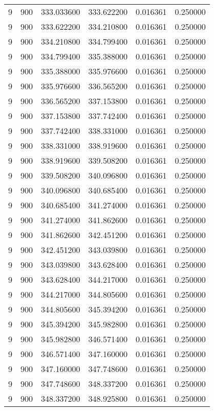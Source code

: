 \begin{longtable}{rrrrrr}
9 & 900 & 333.033600 & 333.622200 & 0.016361 & 0.250000 \\
9 & 900 & 333.622200 & 334.210800 & 0.016361 & 0.250000 \\
9 & 900 & 334.210800 & 334.799400 & 0.016361 & 0.250000 \\
9 & 900 & 334.799400 & 335.388000 & 0.016361 & 0.250000 \\
9 & 900 & 335.388000 & 335.976600 & 0.016361 & 0.250000 \\
9 & 900 & 335.976600 & 336.565200 & 0.016361 & 0.250000 \\
9 & 900 & 336.565200 & 337.153800 & 0.016361 & 0.250000 \\
9 & 900 & 337.153800 & 337.742400 & 0.016361 & 0.250000 \\
9 & 900 & 337.742400 & 338.331000 & 0.016361 & 0.250000 \\
9 & 900 & 338.331000 & 338.919600 & 0.016361 & 0.250000 \\
9 & 900 & 338.919600 & 339.508200 & 0.016361 & 0.250000 \\
9 & 900 & 339.508200 & 340.096800 & 0.016361 & 0.250000 \\
9 & 900 & 340.096800 & 340.685400 & 0.016361 & 0.250000 \\
9 & 900 & 340.685400 & 341.274000 & 0.016361 & 0.250000 \\
9 & 900 & 341.274000 & 341.862600 & 0.016361 & 0.250000 \\
9 & 900 & 341.862600 & 342.451200 & 0.016361 & 0.250000 \\
9 & 900 & 342.451200 & 343.039800 & 0.016361 & 0.250000 \\
9 & 900 & 343.039800 & 343.628400 & 0.016361 & 0.250000 \\
9 & 900 & 343.628400 & 344.217000 & 0.016361 & 0.250000 \\
9 & 900 & 344.217000 & 344.805600 & 0.016361 & 0.250000 \\
9 & 900 & 344.805600 & 345.394200 & 0.016361 & 0.250000 \\
9 & 900 & 345.394200 & 345.982800 & 0.016361 & 0.250000 \\
9 & 900 & 345.982800 & 346.571400 & 0.016361 & 0.250000 \\
9 & 900 & 346.571400 & 347.160000 & 0.016361 & 0.250000 \\
9 & 900 & 347.160000 & 347.748600 & 0.016361 & 0.250000 \\
9 & 900 & 347.748600 & 348.337200 & 0.016361 & 0.250000 \\
9 & 900 & 348.337200 & 348.925800 & 0.016361 & 0.250000 \\

\end{longtable}
